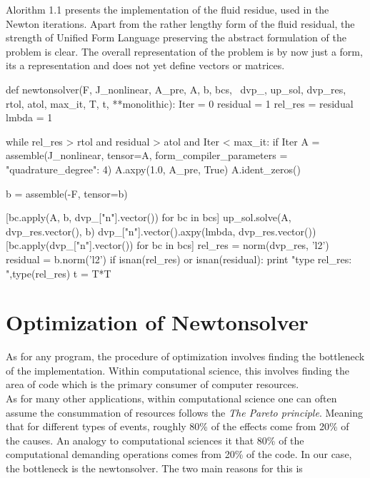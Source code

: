 Alorithm 1.1 presents the implementation of the fluid residue, used in the Newton iterations. Apart from the rather lengthy form of the fluid residual, the strength of Unified Form Language preserving the abstract formulation of the problem is clear. The overall representation of the problem is by now just a form, its a representation and does not yet define vectors or matrices.

\begin{python}[caption=newtonsolver.py]
def newtonsolver(F, J_nonlinear, A_pre, A, b, bcs, \
              dvp_, up_sol, dvp_res, rtol, atol, max_it, T, t, **monolithic):
    Iter      = 0
    residual   = 1
    rel_res    = residual
    lmbda = 1

    while rel_res > rtol and residual > atol and Iter < max_it:
        if Iter %
            A = assemble(J_nonlinear, tensor=A, form_compiler_parameters = {"quadrature_degree": 4}) 
            A.axpy(1.0, A_pre, True)
            A.ident_zeros()

        b = assemble(-F, tensor=b)

        [bc.apply(A, b, dvp_["n"].vector()) for bc in bcs]
        up_sol.solve(A, dvp_res.vector(), b)
        dvp_["n"].vector().axpy(lmbda, dvp_res.vector())
        [bc.apply(dvp_["n"].vector()) for bc in bcs]
        rel_res = norm(dvp_res, 'l2')
        residual = b.norm('l2')
        if isnan(rel_res) or isnan(residual):
            print "type rel_res: ",type(rel_res)
            t = T*T

\end{python}
\section{Optimization of Newtonsolver}
As for any program, the procedure of optimization involves finding the bottleneck of the implementation. Within computational science, this involves finding the area of code which is the primary consumer of computer resources. \\
As for many other applications, within computational science one can often assume the consummation of resources follows the \textit{The Pareto principle}. Meaning that for different types of events, roughly 80\% of the effects come from 20\% of the causes. An analogy to computational sciences it that 80\% of the computational demanding operations comes from 20\% of the code. In our case, the bottleneck is the newtonsolver. The two main reasons for this is 

